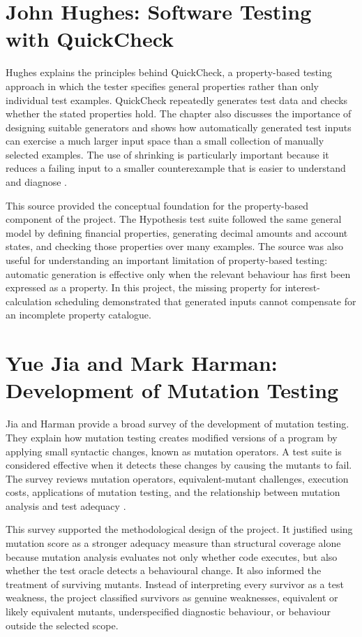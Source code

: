 \documentclass[12pt]{article}
\begin{document}
\section{John Hughes: Software Testing with QuickCheck}

Hughes explains the principles behind QuickCheck, a property-based testing
approach in which the tester specifies general properties rather than only
individual test examples. QuickCheck repeatedly generates test data and checks
whether the stated properties hold. The chapter also discusses the importance
of designing suitable generators and shows how automatically generated test
inputs can exercise a much larger input space than a small collection of
manually selected examples. The use of shrinking is particularly important
because it reduces a failing input to a smaller counterexample that is easier
to understand and diagnose \cite{hughes2010quickcheck}.

This source provided the conceptual foundation for the property-based component
of the project. The Hypothesis test suite followed the same general model by
defining financial properties, generating decimal amounts and account states,
and checking those properties over many examples. The source was also useful
for understanding an important limitation of property-based testing: automatic
generation is effective only when the relevant behaviour has first been
expressed as a property. In this project, the missing property for
interest-calculation scheduling demonstrated that generated inputs cannot
compensate for an incomplete property catalogue.

\section{Yue Jia and Mark Harman: Development of Mutation Testing}

Jia and Harman provide a broad survey of the development of mutation testing.
They explain how mutation testing creates modified versions of a program by
applying small syntactic changes, known as mutation operators. A test suite is
considered effective when it detects these changes by causing the mutants to
fail. The survey reviews mutation operators, equivalent-mutant challenges,
execution costs, applications of mutation testing, and the relationship between
mutation analysis and test adequacy \cite{jia2011mutation}.

This survey supported the methodological design of the project. It justified
using mutation score as a stronger adequacy measure than structural coverage
alone because mutation analysis evaluates not only whether code executes, but
also whether the test oracle detects a behavioural change. It also informed
the treatment of surviving mutants. Instead of interpreting every survivor as
a test weakness, the project classified survivors as genuine weaknesses,
equivalent or likely equivalent mutants, underspecified diagnostic behaviour,
or behaviour outside the selected scope.
\end{document}
